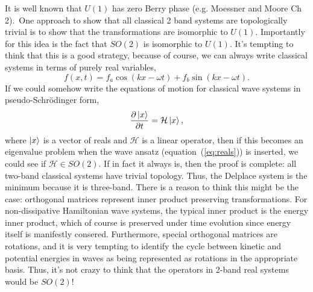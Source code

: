 \documentclass[11pt]{article}
\begin{document}
It is well known that $U(1)$ has zero Berry phase (e.g. Moessner and Moore Ch 2).\
One approach to show that all classical 2 band systems are topologically trivial is to show that the transformations are isomorphic to $U(1)$.
Importantly for this idea is the fact that $SO(2)$ is isomorphic to $U(1)$.
It's tempting to think that this is a good strategy, because of course, we can always write classical systems in terms of purely real variables,
\begin{equation}
  \label{eq:reals}
  f(x,t) = f_a \cos{(k x - \omega t)} + f_b \sin{(k x - \omega t)}.
\end{equation}
If we could somehow write the equations of motion for classical wave systems in pseudo-Schr\"odinger form,
\begin{equation}
  \label{eq:pseudo-schrodinger}
  \frac{\partial \ket{x}}{\partial t} = \mathcal{H} \ket{x},
\end{equation}
where $\ket{x}$ is a vector of reals and $\mathcal{H}$ is a linear operator, then if this becomes an eigenvalue problem when the wave ansatz (equation~(\ref{eq:reals})) is inserted, we could see if $\mathcal{H} \in SO(2)$.
If in fact it always is, then the proof is complete: all two-band classical systems have trivial topology.
Thus, the Delplace system is the minimum because it is three-band.
There is a reason to think this might be the case: orthogonal matrices represent inner product preserving transformations. For non-dissipative Hamiltonian wave systems, the typical inner product is the energy inner product, which of course is preserved under time evolution since energy itself is manifestly consered.
Furthermore, special orthogonal matrices are rotations, and it is very tempting to identify the cycle between kinetic and potential energies in waves as being represented as rotations in the appropriate basis.
Thus, it's not crazy to think that the operators in 2-band real systems would be $SO(2)$!
\end{document}
